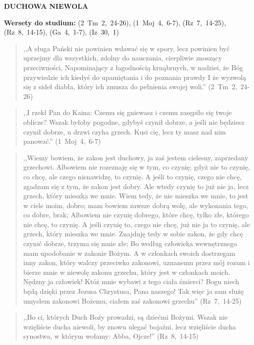\documentclass[10pt,a4paper,oneside]{article}
\begin{document}
\centerline{\textbf{\MakeUppercase{Duchowa niewola}}}
\begin{center}
\textbf{Wersety do studium:} (2~Tm~2,~24-26), (1~Moj~4,~6-7), (Rz~7,~14-25), (Rz~8,~14-15), (Ga~4,~1-7), (Iz~30,~1)
\end{center}
\begin{quote}
,,A sługa Pański nie powinien wdawać się w spory, lecz powinien być uprzejmy dla wszystkich, zdolny do nauczania, cierpliwie znoszący przeciwności, Napominający z łagodnością krnąbrnych, w nadziei, że Bóg przywiedzie ich kiedyś do upamiętania i do poznania prawdy I że wyzwolą się z sideł diabła, który ich zmusza do pełnienia swojej woli.'' (2~Tm~2,~24-26)
\end{quote}
\begin{quote}
,,I rzekł Pan do Kaina: Czemu się gniewasz i czemu zasępiło się twoje oblicze? Wszak byłoby pogodne, gdybyś czynił dobrze, a jeśli nie będziesz czynił dobrze, u drzwi czyha grzech. Kusi cię, lecz ty masz nad nim panować.'' (1~Moj~4,~6-7)
\end{quote}
\begin{quote}
,,Wiemy bowiem, że zakon jest duchowy, ja zaś jestem cielesny, zaprzedany grzechowi. Albowiem nie rozeznaję się w tym, co czynię; gdyż nie to czynię, co chcę, ale czego nienawidzę, to czynię. A jeśli to czynię, czego nie chcę, zgadzam się z tym, że zakon jest dobry. Ale wtedy czynię to już nie ja, lecz grzech, który mieszka we mnie. Wiem tedy, że nie mieszka we mnie, to jest w ciele moim, dobro; mam bowiem zawsze dobrą wolę, ale wykonania tego, co dobre, brak; Albowiem nie czynię dobrego, które chcę, tylko złe, którego nie chcę, to czynię. A jeśli czynię to, czego nie chcę, już nie ja to czynię, ale grzech, który mieszka we mnie. Znajduję tedy w sobie zakon, że gdy chcę czynić dobrze, trzyma się mnie złe; Bo według człowieka wewnętrznego mam upodobanie w zakonie Bożym. A w członkach swoich dostrzegam inny zakon, który walczy przeciwko zakonowi, uznanemu przez mój rozum i bierze mnie w niewolę zakonu grzechu, który jest w członkach moich. Nędzny ja człowiek! Któż mnie wybawi z tego ciała śmierci? Bogu niech będą dzięki przez Jezusa Chrystusa, Pana naszego! Tak więc ja sam służę umysłem zakonowi Bożemu, ciałem zaś zakonowi grzechu'' (Rz~7,~14-25)
\end{quote}
\begin{quote}
,,Bo ci, których Duch Boży prowadzi, są dziećmi Bożymi. Wszak nie wzięliście ducha niewoli, by znowu ulegać bojaźni, lecz wzięliście ducha synostwa, w którym wołamy: Abba, Ojcze!'' (Rz~8,~14-15)
\end{quote}
\end{document}
